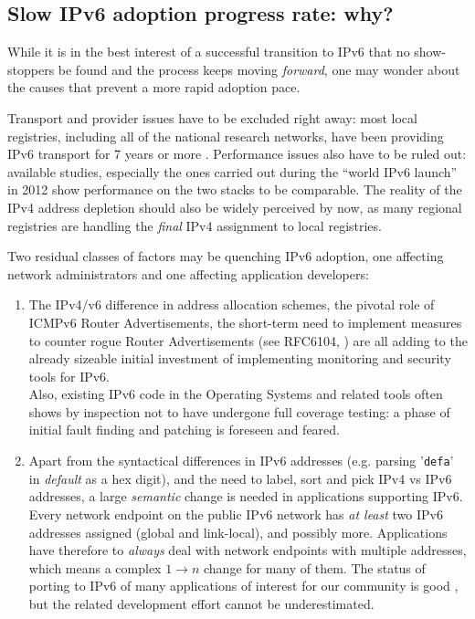 \subsection{Slow IPv6 adoption progress rate: why?}
While it is in the best interest of a successful transition to IPv6 that
no show-stoppers be found and the process keeps moving {\it forward},
one may wonder about the causes that prevent a more rapid adoption pace.\par
Transport and provider issues have to be excluded right away: most
local registries, including all of the national research networks, have been
providing IPv6 transport for 7 years or more \cite{ripeness}. Performance issues also have to
be ruled out: available studies, especially the ones carried out during the
``world IPv6 launch'' in 2012 \cite{wdayperf} show performance on 
the two stacks to be comparable. The reality of the IPv4 
address depletion
should also be widely perceived by now, as many regional registries are
handling the {\it final} IPv4 assignment to local registries.\par
Two residual classes of factors may be quenching IPv6 adoption, one
affecting network administrators and one affecting application developers:
\begin{enumerate}
\item {\small
The IPv4/v6 difference in address allocation schemes, the pivotal role of
ICMPv6 Router Advertisements, the short-term
need to implement measures to counter rogue Router Advertisements 
(see RFC6104, \cite{rfc}) are all adding to the already sizeable initial 
investment of implementing monitoring and security tools for IPv6.\\
Also, existing IPv6 code in the Operating Systems and related tools often
shows by inspection not to have undergone full coverage testing:
a phase of initial fault finding and patching is foreseen and feared.
}
\item {\small
Apart from the syntactical differences in IPv6 addresses (e.g. parsing
'{\tt defa}' in {\it default} as a hex digit), and the need to label, sort and 
pick IPv4 vs IPv6 addresses, a large {\it semantic} change is
needed in applications supporting IPv6. Every network endpoint on the
public IPv6 network has {\it at least} two IPv6 addresses assigned (global
and link-local), and possibly more. Applications have therefore
to {\it always} deal with network endpoints with multiple addresses, which means a complex
$1\rightarrow n$ change for many of them. The status of porting to IPv6 of
many applications of interest for our community is good \cite{readiness},
but the related development effort cannot be underestimated.
}
\end{enumerate}
